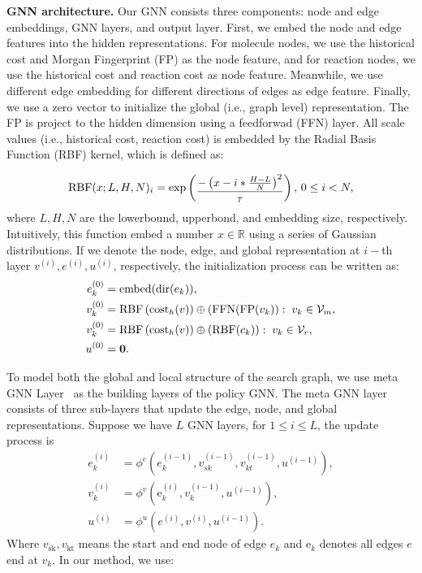 \documentclass[sigconf]{acmart}
\begin{document}
\noindent\textbf{GNN architecture.}
Our GNN consists three components: node and edge embeddings, GNN layers, and output layer.
First, we embed the node and edge features into the hidden representations.
For molecule nodes, we use the historical cost and Morgan Fingerprint (FP) as the node feature, and for reaction nodes, we use the historical cost and reaction cost as node feature.
Meanwhile, we use different edge embedding for different directions of edges as edge feature.
Finally, we use a zero vector to initialize the global (i.e., graph level) representation.
The FP is project to the hidden dimension using a feedforwad (FFN) layer.
All scale values (i.e., historical cost, reaction cost) is embedded by the Radial Basis Function (RBF) kernel, which is defined as:

\begin{equation}
    \text{RBF}(x;L,H,N)_i = \exp\left(
    \vcenter{\hbox{$\displaystyle
    {\frac{-\left(x-i*\frac{H-L}{N}\right)^2}{\tau}}
    $}}
    \right), \, 0 \le i < N,
\end{equation}
where $L, H, N$ are the lowerbound, upperbond, and embedding size, respectively.
Intuitively, this function embed a number $x\in\mathbb{R}$ using a series of Gaussian distributions.
If we denote the node, edge, and global representation at $i-$th layer $v^{(i)}, e^{(i)}, u^{(i)}$, respectively, the initialization process can be written as:
\begin{align}
    e^{(0)}_k &= \text{embed}(\text{dir}(e_k)), \\
    v^{(0)}_k &= \text{RBF}\left(\text{cost}_h(v)\right) \oplus ( \text{FFN}(\text{FP}(v_k)): \; v_k \in \mathcal{V}_m,  \\
    v^{(0)}_k &= \text{RBF}\left(\text{cost}_h(v)\right) \oplus ( \text{RBF}(c_k)) : \; v_k \in \mathcal{V}_r, \\
    u^{(0)} &= \vb{0}.
\end{align}

To model both the global and local structure of the search graph, we use meta GNN Layer~\cite{battaglia2018relational} as the building layers of the policy GNN.
The meta GNN layer consists of three sub-layers that update the edge, node, and global representations.
Suppose we have $L$ GNN layers, for $1 \le i \le L$, the update process is
\begin{align}
        e^{(i)}_k &= \phi^e\left(e^{(i-1)}_k, v^{(i-1)}_{sk}, v^{(i-1)}_{kt}, u^{(i-1)}\right), \\
        v^{(i)}_k &= \phi^v\left(\mathrm{e}^{(i)}_k, v^{(i-1)}_k, u^{(i-1)}\right), \\
        u^{(i)} &= \phi^{u}\left(e^{(i)}, v^{(i)}, u^{(i-1)}\right).
\end{align}
Where $v_{\text{sk}}, v_{\text{kt}}$ means the start and end node of edge $e_k$ and $\mathrm{e}_k$ denotes all edges $e$ end at $v_k$.
In our method, we use:
\end{document}
